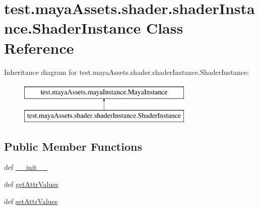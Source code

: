 \hypertarget{classtest_1_1mayaAssets_1_1shader_1_1shaderInstance_1_1ShaderInstance}{\section{test.\-maya\-Assets.\-shader.\-shader\-Instance.\-Shader\-Instance \-Class \-Reference}
\label{d0/dcf/classtest_1_1mayaAssets_1_1shader_1_1shaderInstance_1_1ShaderInstance}
}
\-Inheritance diagram for test.\-maya\-Assets.\-shader.\-shader\-Instance.\-Shader\-Instance\-:\begin{figure}[H]
\begin{center}
\leavevmode
\includegraphics[height=2.000000cm]{d0/dcf/classtest_1_1mayaAssets_1_1shader_1_1shaderInstance_1_1ShaderInstance}
\end{center}
\end{figure}
\subsection*{\-Public \-Member \-Functions}
\begin{DoxyCompactItemize}
\item 
def \hyperlink{classtest_1_1mayaAssets_1_1shader_1_1shaderInstance_1_1ShaderInstance_a248aa39dd6323fb65b5656f7ea4c13d0}{\-\_\-\-\_\-init\-\_\-\-\_\-}
\item 
def \hyperlink{classtest_1_1mayaAssets_1_1shader_1_1shaderInstance_1_1ShaderInstance_a33490d97f365b970f208826f848a441d}{get\-Attr\-Values}
\item 
def \hyperlink{classtest_1_1mayaAssets_1_1shader_1_1shaderInstance_1_1ShaderInstance_a4cd9c9bfdf3d1959177fe597fd7356b9}{set\-Attr\-Values}
\end{DoxyCompactItemize}


